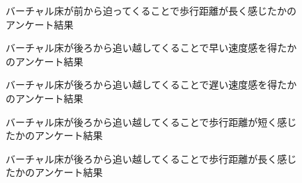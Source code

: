 \begin{figure}[H]
    \centering
    \caption{バーチャル床が前から迫ってくることで歩行距離が長く感じたかのアンケート結果}
    \label{fig:f4}
\end{figure}
\begin{figure}[H]
    \centering
    \caption{バーチャル床が後ろから追い越してくることで早い速度感を得たかのアンケート結果}
    \label{fig:b1}
\end{figure}
\begin{figure}[H]
    \centering
    \caption{バーチャル床が後ろから追い越してくることで遅い速度感を得たかのアンケート結果}
    \label{fig:b2}
\end{figure}
\begin{figure}[H]
    \centering
    \caption{バーチャル床が後ろから追い越してくることで歩行距離が短く感じたかのアンケート結果}
    \label{fig:b3}
\end{figure}
\begin{figure}[H]
    \centering
    \caption{バーチャル床が後ろから追い越してくることで歩行距離が長く感じたかのアンケート結果}
    \label{fig:b4}
\end{figure}

